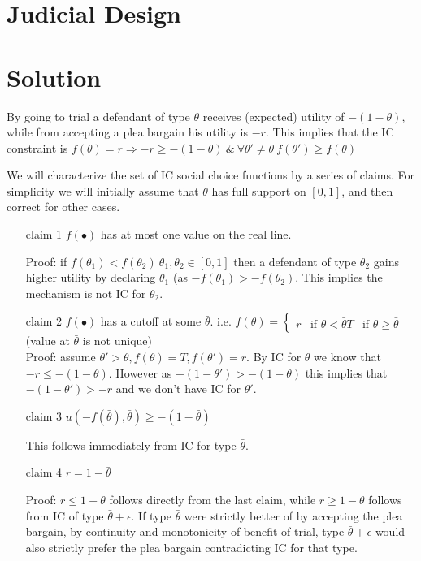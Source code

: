 \documentclass{article}
\newcommand{\enterProblemHeader}[1]{
\nobreak\extramarks{#1}{#1 continued on next page\ldots}\nobreak
\nobreak\extramarks{#1 (continued)}{#1 continued on next page\ldots}\nobreak
}
\newcommand{\exitProblemHeader}[1]{
\nobreak\extramarks{#1 (continued)}{#1 continued on next page\ldots}\nobreak
\nobreak\extramarks{#1}{}\nobreak
}
\newcounter{homeworkProblemCounter} %
\newcommand{\homeworkProblemName}{}
\newenvironment{ex}[1][Problem \arabic{homeworkProblemCounter}]{ %
\stepcounter{homeworkProblemCounter} %
\renewcommand{\homeworkProblemName}{#1} %
\section{\homeworkProblemName} %
}{
}
\newif\ifsolutions
\begin{document}
\begin{ex}[Judicial Design]
	\ifsolutions
	\section*{Solution}
	By going to trial a defendant of type $\theta$ receives (expected) utility of $-(1-\theta)$, while from accepting a plea bargain his utility is $-r$. This implies that the IC constraint is $f(\theta)=r \Rightarrow -r\geq -(1-\theta) ~\&~ \forall \theta' \neq \theta ~ f(\theta') \geq f(\theta)$
	

	We will characterize the set of IC social choice functions by a series of claims. For simplicity we will initially assume that $\theta$ has full support on $[0,1]$, and then correct for other cases.

	\begin{itemize}

		\item[claim 1] $f(\bullet)$ has at most one value on the real line.
		
		Proof: if $f(\theta_1)<f(\theta_2) ~\theta_1,\theta_2 \in [0,1]$ then a defendant of type $\theta_2$ gains higher utility by declaring $\theta_1$ (as $-f(\theta_1)>-f(\theta_2)$. This implies the mechanism is not IC for $\theta_2$.

		\item[claim 2] $f(\bullet)$ has a cutoff at some $\bar{\theta}$. i.e. $f(\theta)= \begin{cases} r & \text{if } \theta<\bar{\theta}
		
		T & \text{if } \theta\geq\bar{\theta} \end{cases}$ (value at $\bar{\theta}$ is not unique)\\

		Proof: assume $\theta'>\theta , f(\theta)=T, f(\theta')=r$. By IC for $\theta$ we know that $-r\leq -(1-\theta)$. However as $-(1-\theta')>-(1-\theta)$ this implies that $-(1-\theta')>-r$ and we don't have IC for $\theta'$.
		
		\item[claim 3] $u(-f(\bar{\theta}),\bar{\theta})\geq -(1-\bar{\theta})$
		
		This follows immediately from IC for type $\bar{\theta}$.
		
		\item[claim 4] $r= 1-\bar{\theta}$
		
		Proof: $r\leq 1-\bar{\theta}$ follows directly from the last claim, while $r\geq 1-\bar{\theta}$ follows from IC of type $\bar{\theta}+\epsilon$. If type $\bar{\theta}$ were strictly better of by accepting the plea bargain, by continuity and monotonicity of benefit of trial, type $\bar{\theta}+\epsilon$ would also strictly prefer the plea bargain contradicting IC for that type.


\end{itemize}
\end{ex}
\end{document}
